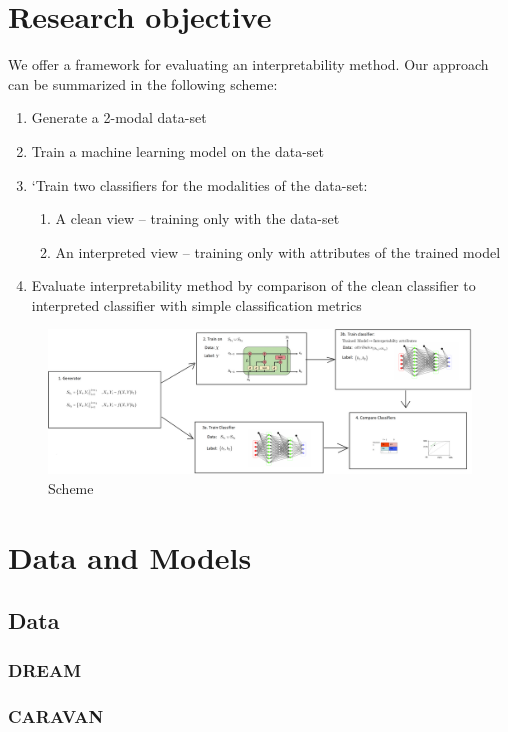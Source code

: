 \documentclass[12pt]{report}
\begin{document}
\chapter{Research objective } 

We offer a framework for evaluating an interpretability method. Our approach can be summarized in
the following scheme:
\begin{enumerate}
	\item Generate a 2-modal data-set
	\item Train a machine learning model on the data-set
	\item`Train two classifiers for the modalities of the data-set:
	\begin{enumerate}
		\item A clean view – training only with the data-set
		\item An interpreted view – training only with attributes of the trained model 	
    \end{enumerate}
	\item Evaluate interpretability method by comparison of the clean classifier to interpreted classifier
	with simple classification metrics		
\end{enumerate}
\begin{figure}[H]\centering\includegraphics[width=17cm]{scheme.png}\caption{Scheme}\end{figure}
\chapter{Data and Models} 
\section{Data}
\subsection{DREAM}
\subsection{CARAVAN}
\end{document}
